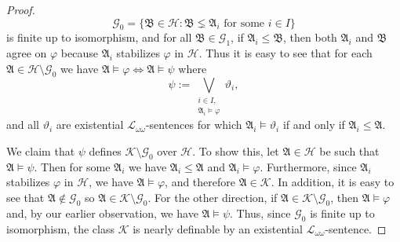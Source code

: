 \documentclass{ndjflart}
\theoremstyle{plain}
\theoremstyle{definition}
\numberwithin{equation}{section}
\begin{document}
\begin{proof}
\[
	\mathcal{G}_0 = \{\mathfrak{B}\in\mathcal{H} \colon 
	\mathfrak{B} \lneq \mathfrak{A}_i \text{ for some } i \in I \}
\]
is finite up to isomorphism,
and for all $\mathfrak{B} \in \mathcal{G}_1$,
if $\mathfrak{A}_i\leq\mathfrak{B}$, then both $\mathfrak{A}_i$ and
$\mathfrak{B}$ agree on $\varphi$ because $\mathfrak{A}_i$ stabilizes
$\varphi$ in $\mathcal{H}$.
Thus it is easy to see that for each
$\mathfrak{A}\in\mathcal{H} \setminus \mathcal{G}_0$ we have
$\mathfrak{A} \vDash \varphi \Leftrightarrow \mathfrak{A} \vDash \psi$ where
\[
\psi := \bigvee_{\substack{i\in I,\\\mathfrak{A}_i\vDash\varphi}}\vartheta_i,
\]
and all $\vartheta_i$ are existential $\mathcal{L}_{\omega \omega}$-sentences
for which $\mathfrak{A}_i \vDash \vartheta_i$ if and only if
$\mathfrak{A}_i \leq \mathfrak{A}$.

We claim that $\psi$ defines $\mathcal{K} \setminus \mathcal{G}_0$ over 
$\mathcal{H}$.
To show this, let $\mathfrak{A} \in \mathcal{H}$ be such that
$\mathfrak{A} \vDash \psi$.
Then for some $\mathfrak{A}_i$ we have $\mathfrak{A}_i \leq \mathfrak{A}$ and
$\mathfrak{A}_i \vDash \varphi$.
Furthermore, since $\mathfrak{A}_i$ stabilizes $\varphi$ in $\mathcal{H}$, we
have $\mathfrak{A} \vDash \varphi$, and therefore 
$\mathfrak{A} \in \mathcal{K}$.
In addition, it is easy to see that $\mathfrak{A} \notin \mathcal{G}_0$ so
$\mathfrak{A} \in \mathcal{K} \setminus \mathcal{G}_0$.
For the other direction, if 
$\mathfrak{A} \in \mathcal{K} \setminus \mathcal{G}_0$,
then $\mathfrak{A} \vDash \varphi$ and, by our earlier observation, we have
$\mathfrak{A} \vDash \psi$.
Thus, since $\mathcal{G}_0$ is finite up to isomorphism, the class $\mathcal{K}$ is nearly
definable by an existential $\mathcal{L}_{\omega\omega}$-sentence.
\end{proof}
\end{document}
